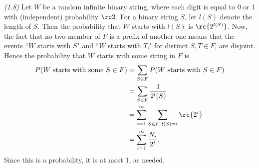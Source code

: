 \begin{problem} {\it (1.8)}
Let $W$ be a random infinite binary string, where each digit is equal to 0 or 1 with (independent) probability $\rc 2$. For a binary string $S$, let $l(S)$ denote the length of $S$. Then the probability that $W$ starts with $l(S)$ is $\rc{2^{l(S)}}$. Now, the fact that no two member of $F$ is a prefix of another one means that the events ``$W$ starts with $S$" and ``$W$ starts with $T$," for distinct $S,T\in F$, are disjoint. Hence the probability that $W$ starts with some string in $F$ is
\begin{align*}
P(W\text{ starts with some }S\in F)&=\sum_{S\in F} P(W\text{ starts with }S\in F)\\
&=\sum_{S\in F}\frac{1}{2^l(S)}\\
&=\sum_{i=1}^{\infty}\sum_{S\in F, \,l(S)=i}\rc{2^i}\\
&=\sum_{i=1}^{\infty} \frac{N_i}{2^i}.
\end{align*}
Since this is a probability, it is at most 1, as needed.
\end{problem}
